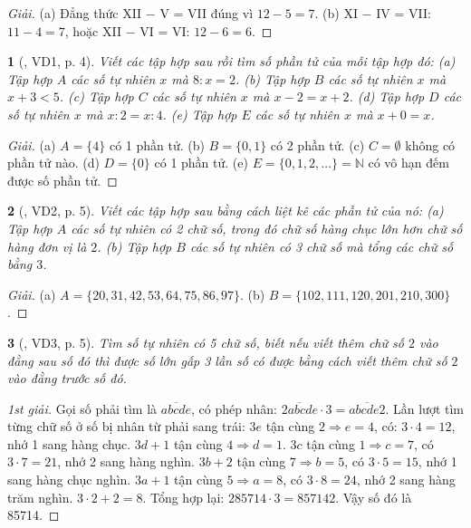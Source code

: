 \documentclass{article}
\newtheorem{baitoan}{}
\begin{document}
\begin{proof}[Giải]
	(a) Đẳng thức XII $-$ V = VII đúng vì $12 - 5 = 7$. (b) XI $-$ IV = VII: $11 - 4 = 7$, hoặc XII $-$ VI = VI: $12 - 6 = 6$.
\end{proof}

\begin{baitoan}[\cite{Binh_Toan_6_tap_1}, VD1, p. 4]
	Viết các tập hợp sau rồi tìm số phần tử của mỗi tập hợp đó: (a) Tập hợp $A$ các số tự nhiên $x$ mà $8:x = 2$. (b) Tập hợp $B$ các số tự nhiên $x$ mà $x + 3 < 5$. (c) Tập hợp $C$ các số tự nhiên $x$ mà $x - 2 = x + 2$. (d) Tập hợp $D$ các số tự nhiên $x$ mà $x:2 = x:4$. (e) Tập hợp $E$ các số tự nhiên $x$ mà $x + 0 = x$.
\end{baitoan}

\begin{proof}[Giải]
	(a) $A = \{4\}$ có 1 phần tử. (b) $B = \{0,1\}$ có 2 phần tử. (c) $C = \emptyset$ không có phần tử nào. (d) $D = \{0\}$ có 1 phần tử. (e) $E = \{0,1,2,\ldots\} = \mathbb{N}$ có vô hạn đếm được số phần tử.
\end{proof}

\begin{baitoan}[\cite{Binh_Toan_6_tap_1}, VD2, p. 5]
	Viết các tập hợp sau bằng cách liệt kê các phần tử của nó: (a) Tập hợp $A$ các số tự nhiên có 2 chữ số, trong đó chữ số hàng chục lớn hơn chữ số hàng đơn vị là $2$. (b) Tập hợp $B$ các số tự nhiên có 3 chữ số mà tổng các chữ số bằng $3$.
\end{baitoan}

\begin{proof}[Giải]
	(a) $A = \{20,31,42,53,64,75,86,97\}$. (b) $B = \{102,111,120,201,210,300\}$.
\end{proof}

\begin{baitoan}[\cite{Binh_Toan_6_tap_1}, VD3, p. 5]
	Tìm số tự nhiên có 5 chữ số, biết nếu viết thêm chữ số $2$ vào đằng sau số đó thì được số lớn gấp 3 lần số có được bằng cách viết thêm chữ số $2$ vào đằng trước số đó.
\end{baitoan}

\begin{proof}[1st giải]
	Gọi số phải tìm là $\overline{abcde}$, có phép nhân: $\overline{2abcde}\cdot3 = \overline{abcde2}$. Lần lượt tìm từng chữ số ở số bị nhân từ phải sang trái: $3e$ tận cùng $2\Rightarrow e = 4$, có: $3\cdot4 = 12$, nhớ 1 sang hàng chục. $3d + 1$ tận cùng $4\Rightarrow d = 1$. $3c$ tận cùng $1\Rightarrow c = 7$, có $3\cdot7 = 21$, nhớ 2 sang hàng nghìn. $3b + 2$ tận cùng $7\Rightarrow b = 5$, có $3\cdot5 = 15$, nhớ 1 sang hàng chục nghìn. $3a + 1$ tận cùng $5\Rightarrow a = 8$, có $3\cdot8 = 24$, nhớ 2 sang hàng trăm nghìn. $3\cdot2 + 2 = 8$. Tổng hợp lại: $285714\cdot3 = 857142$. Vậy số đó là 85714.
\end{proof}
\end{document}
